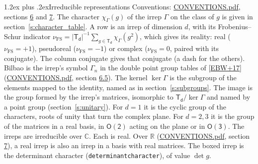 \documentclass[10pt,a4paper]{article}
\makeatletter
\renewcommand\section{\@startsection{section}{1}{\z@}{-3ex plus -1ex minus -.2ex}%
  {1.2ex plus .2ex}{\normalfont\large\sffamily\bfseries\color{parttitle}}}
\numberwithin{equation}{section}
\newcommand{\grp}[1]{\mathsf{#1}}
\newcommand{\irchar}[1]{\chi_{#1}}
\newcommand{\fsind}{\nu_{\mathrm{FS}}}
\makeatother
\begin{document}
\section{Irreducible representations}\label{s:irreps}
Conventions: \href{../../CONVENTIONS.pdf}{CONVENTIONS.pdf}, sections \href{../../CONVENTIONS.pdf\#conv.6}{6} and \href{../../CONVENTIONS.pdf\#conv.7}{7}.
\leavevmode\label{n:function.character}\label{n:irrep.Gamma}The character $\irchar{\Gamma}(g)$ of the irrep $\Gamma$ on the class of $g$ is given in section~\ref{s:character_table}.
\leavevmode\label{n:index.dimension}\label{n:index.frobenius}\label{n:head.irrep}\label{n:head.reality}A row is an irrep of dimension $d$, with its Frobenius--Schur indicator $\fsind = |\grp{T_{d}}|^{-1}\allowbreak\sum_{g\in\grp{T_{d}}}\irchar{\Gamma}(g^2)$, which gives its reality: real ($\fsind = +1$), pseudoreal ($\fsind = -1$) or complex ($\fsind = 0$, paired with its conjugate). \label{n:head.conjugate}The column conjugate gives that conjugate (a dash for the others). \label{n:head.bilbao}\label{n:irrep.alias.gamma}Bilbao is the irrep's symbol $\Gamma_n$ in the double point group tables of [\href{../../../REFERENCES.pdf\#ref.EBW+17}{EBW+17}] (\href{../../CONVENTIONS.pdf}{CONVENTIONS.pdf}, section \href{../../CONVENTIONS.pdf\#conv.6.5}{6.5}). \label{n:head.kernel}The kernel $\ker\Gamma$ is the subgroup of the elements mapped to the identity, named as in section~\ref{s:subgroups}. \label{n:head.image}The image is the group formed by the irrep's matrices, isomorphic to $\grp{T_{d}}/\ker\Gamma$ and named by a point group (section~\ref{s:unitary}). For $d = 1$ it is the cyclic group of the characters, roots of unity that turn the complex plane. For $d = 2, 3$ it is the group of the matrices in a real basis, in $\grp{O(2)}$ acting on the plane or in \href{O3.pdf}{$\grp{O(3)}$}. The irreps are irreducible over $\mathbb{C}$. Each is real. Over $\mathbb{R}$ (\href{../../CONVENTIONS.pdf}{CONVENTIONS.pdf}, section \href{../../CONVENTIONS.pdf\#conv.7}{7}), a real irrep is also an irrep in a basis with real matrices. \label{n:mark.determinant}The boxed irrep is the determinant character (\texttt{determinantcharacter}), of value $\det g$.
\setlength{\emergencystretch}{2em}\par\setlength{\emergencystretch}{0pt}
\end{document}
